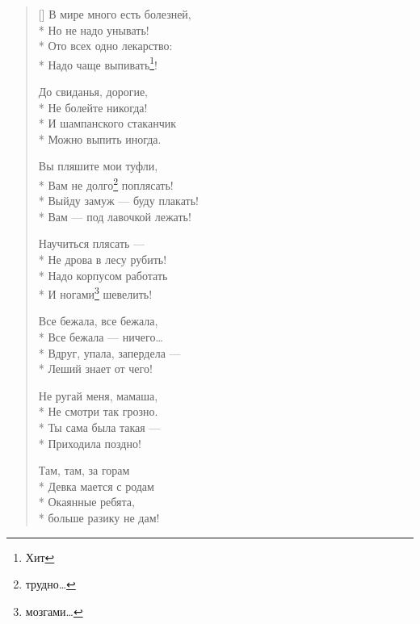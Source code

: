 \documentclass[a4paper,oneside,14pt]{scrbook}
\begin{document}
\begin{verse}[\versewidth]
        В мире много есть болезней,\\*
        Но не надо унывать!\\*
        Ото всех одно лекарство:\\*
        Надо чаще выпивать\footnote{Хит}!

    
        До свиданья, дорогие,\\*
        Не болейте никогда!\\*
        И шампанского стаканчик\\*
        Можно выпить иногда.
        
        Вы пляшите мои туфли,\\*
        Вам не долго\footnote{трудно\ldots} поплясать!\\*
        Выйду замуж --- буду плакать!\\*
        Вам --- под лавочкой лежать!
        
        Научиться плясать ---\\*
        Не дрова в лесу рубить!\\*
        Надо корпусом работать\\*
        И ногами\footnote{мозгами\ldots} шевелить!
        
        Все бежала, все бежала, \\*
        Все бежала --- ничего\ldots\\*
        Вдруг, упала, запердела --- \\*
        Леший знает от чего!
        
        Не ругай меня, мамаша,\\*
        Не смотри так грозно.\\*
        Ты сама была такая ---\\*
        Приходила поздно!
        
        Там, там, за горам\\*
        Девка мается с родам\\*
        Окаянные ребята,\\*
        \vin больше разику не дам!
    \end{verse}    
\end{document}
